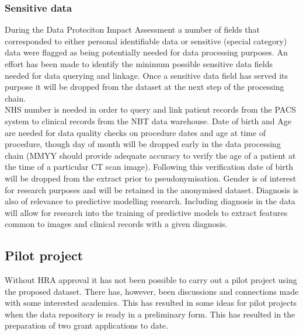 \documentclass{article}
\begin{document}
\subsubsection{Sensitive data}

During the Data Proteciton Impact Assessment a number of fields that
corresponded to either personal
identifiable data or sensitive (special category) data were flagged as being potentially needed for data
processing purposes. An effort has been made to identify the minimum possible sensitive
data fields needed for data querying and linkage. Once a sensitive
data field has served its purpose it will be dropped from the dataset
at the next step of the processing chain. \\

NHS number is needed in
order to query and link patient records from the PACS system to
clinical records from the NBT data warehouse.
Date of birth and Age are needed for data quality checks on procedure
dates and age at time of procedure, though day of month will be
dropped early in the data processing chain (MMYY should provide
adequate accuracy to verify the age of a patient at the time of a
particular CT scan image). Following this verification date of birth
will be dropped from the extract prior to pseudonymisation.
Gender is of interest for research purposes and will be
retained in the anonymised dataset.  Diagnosis is also of relevance to
predictive modelling research. Including diagnosis in the data will
allow for research into the training of predictive models to extract
features common to images and clinical records with a given diagnosis.


\subsection{Pilot project}

Without HRA approval it has not been possible to carry out a pilot
project using the proposed dataset. There has, however, been
discussions and connections made with some interested academics. This
has resulted in some ideas for pilot projects when the data repository
is ready in a preliminary form. This has resulted in the preparation
of two grant applications to date. \\
\end{document}
